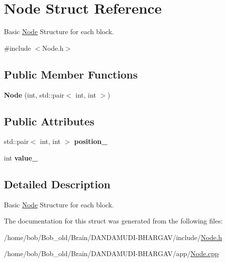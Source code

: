 \hypertarget{structNode}{}\section{Node Struct Reference}
\label{structNode}


Basic \hyperlink{structNode}{Node} Structure for each block.  




{\ttfamily \#include $<$Node.\+h$>$}

\subsection*{Public Member Functions}
\begin{DoxyCompactItemize}
\item 
{\bfseries Node} (int, std\+::pair$<$ int, int $>$)\hypertarget{structNode_a52f3b09372a1fe38e7749ee7f2c31e6f}{}\label{structNode_a52f3b09372a1fe38e7749ee7f2c31e6f}

\end{DoxyCompactItemize}
\subsection*{Public Attributes}
\begin{DoxyCompactItemize}
\item 
std\+::pair$<$ int, int $>$ {\bfseries position\+\_\+}\hypertarget{structNode_a50df561df296192769e0a2d1bd60e46b}{}\label{structNode_a50df561df296192769e0a2d1bd60e46b}

\item 
int {\bfseries value\+\_\+}\hypertarget{structNode_a294fa286e0cfcd8b3095ac1b168617d9}{}\label{structNode_a294fa286e0cfcd8b3095ac1b168617d9}

\end{DoxyCompactItemize}


\subsection{Detailed Description}
Basic \hyperlink{structNode}{Node} Structure for each block. 

The documentation for this struct was generated from the following files\+:\begin{DoxyCompactItemize}
\item 
/home/bob/\+Bob\+\_\+old/\+Brain/\+D\+A\+N\+D\+A\+M\+U\+D\+I-\/\+B\+H\+A\+R\+G\+A\+V/include/\hyperlink{Node_8h}{Node.\+h}\item 
/home/bob/\+Bob\+\_\+old/\+Brain/\+D\+A\+N\+D\+A\+M\+U\+D\+I-\/\+B\+H\+A\+R\+G\+A\+V/app/\hyperlink{Node_8cpp}{Node.\+cpp}\end{DoxyCompactItemize}
